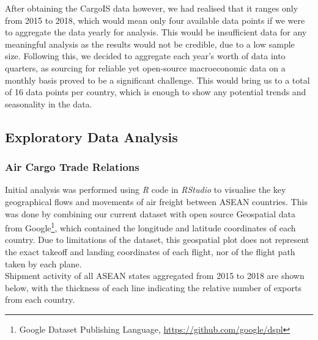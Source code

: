 \documentclass{article}
\begin{document}
\noindent After obtaining the CargoIS data however, we had realised that it ranges only from 2015 to 2018, which would mean only four available data points if we were to aggregate the data yearly for analysis. This would be insufficient data for any meaningful analysis as the results would not be credible, due to a low sample size. Following this, we decided to aggregate each year's worth of data into quarters, as sourcing for reliable yet open-source macroeconomic data on a monthly basis proved to be a significant challenge. This would bring us to a total of 16 data points per country, which is enough to show any potential trends and seasonality in the data. 

\subsection{Exploratory Data Analysis}

\subsubsection{Air Cargo Trade Relations}

Initial analysis was performed using \textit{R} code in \textit{RStudio} to visualise the key geographical flows and movements of air freight between ASEAN countries. This was done by combining our current dataset with open source Geospatial data from Google\footnote{Google Dataset Publishing Language, \url{https://github.com/google/dspl}}, which contained the longitude and latitude coordinates of each country. Due to limitations of the dataset, this geospatial plot does not represent the exact takeoff and landing coordinates of each flight, nor of the flight path taken by each plane. \\ 

\noindent Shipment activity of all ASEAN states aggregated from 2015 to 2018 are shown below, with the thickness of each line indicating the relative number of exports from each country.
\end{document}
